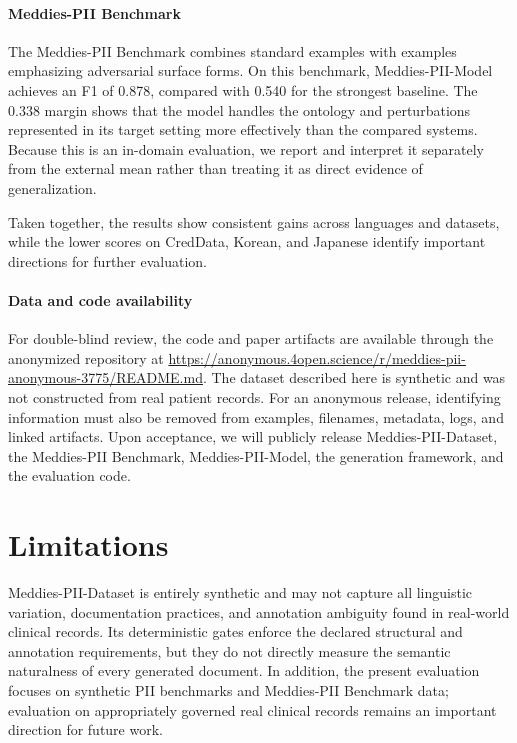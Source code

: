 \documentclass[11pt]{article}
\begin{document}
\paragraph{Meddies-PII Benchmark} The Meddies-PII Benchmark combines standard examples with examples emphasizing adversarial surface forms. On this benchmark, Meddies-PII-Model achieves an F1 of 0.878, compared with 0.540 for the strongest baseline. The 0.338 margin shows that the model handles the ontology and perturbations represented in its target setting more effectively than the compared systems. Because this is an in-domain evaluation, we report and interpret it separately from the external mean rather than treating it as direct evidence of generalization.

Taken together, the results show consistent gains across languages and datasets, while the lower scores on CredData, Korean, and Japanese identify important directions for further evaluation.

\paragraph{Data and code availability} For double-blind review, the code and paper artifacts are available through the anonymized repository at \url{https://anonymous.4open.science/r/meddies-pii-anonymous-3775/README.md}. The dataset described here is synthetic and was not constructed from real patient records. For an anonymous release, identifying information must also be removed from examples, filenames, metadata, logs, and linked artifacts. Upon acceptance, we will publicly release Meddies-PII-Dataset, the Meddies-PII Benchmark, Meddies-PII-Model, the generation framework, and the evaluation code.

\section{Limitations}

Meddies-PII-Dataset is entirely synthetic and may not capture all linguistic variation, documentation practices, and annotation ambiguity found in real-world clinical records. Its deterministic gates enforce the declared structural and annotation requirements, but they do not directly measure the semantic naturalness of every generated document. In addition, the present evaluation focuses on synthetic PII benchmarks and Meddies-PII Benchmark data; evaluation on appropriately governed real clinical records remains an important direction for future work.
\end{document}
